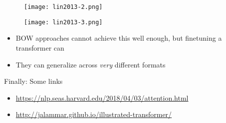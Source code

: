 \begin{frame}[plain]
\begin{figure}
	\centering
	\texttt{[image: lin2013-2.png]}
\end{figure}
\end{frame}


\begin{frame}[plain]
\begin{figure}
	\centering
	\texttt{[image: lin2013-3.png]}
\end{figure}
\end{frame}


\begin{frame}{\textcite{lin2013}}
  \begin{itemize}
  \item BOW approaches cannot achieve this well enough, but finetuning a transformer can
  \item They can generalize across \emph{very} different formats
  \end{itemize}

\end{frame}





\begin{frame}{Finally: Some links}
\begin{itemize}
\item \url{https://nlp.seas.harvard.edu/2018/04/03/attention.html}
\item \url{http://jalammar.github.io/illustrated-transformer/}
\end{itemize}
\end{frame}



